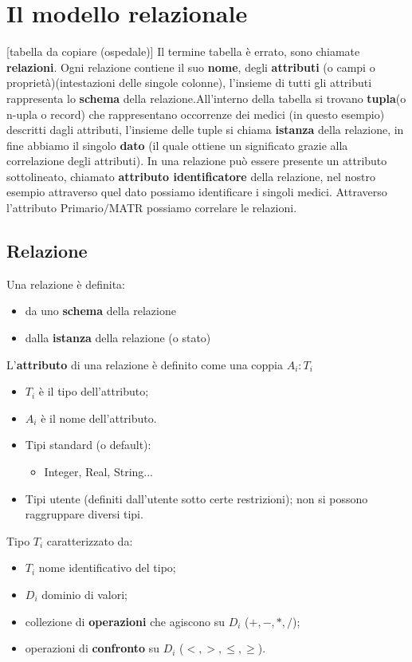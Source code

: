 \documentclass[10pt,twocolumn]{article}
\begin{document}
\section{Il modello relazionale}
[tabella da copiare (ospedale)]
\newline
Il termine tabella è errato, sono chiamate \textbf{relazioni}.
Ogni relazione contiene il suo \textbf{nome}, degli \textbf{attributi} (o campi o proprietà)(intestazioni delle singole colonne), l'insieme di tutti gli attributi rappresenta lo \textbf{schema} della relazione.\newline All'interno della tabella si trovano \textbf{tupla}(o n-upla o record) che rappresentano occorrenze dei medici (in questo esempio) descritti dagli attributi, l'insieme delle tuple si chiama \textbf{istanza} della relazione, in fine abbiamo il singolo \textbf{dato} (il quale ottiene un significato grazie alla correlazione degli attributi).  \newline In una relazione può essere presente un attributo sottolineato, chiamato \textbf{attributo identificatore} della relazione, nel nostro esempio attraverso quel dato possiamo identificare i singoli medici. \newline Attraverso l'attributo Primario$/$MATR possiamo correlare le relazioni. 

\subsection{Relazione}
Una relazione è definita:
\begin{itemize}
    \item da uno \textbf{schema} della relazione
    \item dalla \textbf{istanza} della relazione (o stato)
\end{itemize}
L'\textbf{attributo} di una relazione è definito come una coppia $A_i:T_i$
\begin{itemize}
    \item $T_i$ è il tipo dell'attributo;
    \item $A_i$ è il nome dell'attributo.
\end{itemize}
\begin{itemize}
    \item Tipi standard (o default):
    \begin{itemize}
        \item Integer, Real, String...
    \end{itemize}
    \item Tipi utente (definiti dall'utente sotto certe restrizioni); non si possono raggruppare diversi tipi.
\end{itemize}
Tipo $T_i$ caratterizzato da:
\begin{itemize}
    \item $T_i$ nome identificativo del tipo;
    \item $D_i$ dominio di valori;
    \item collezione di \textbf{operazioni} che agiscono su $D_i$ ($+,-,*,/$);
    \item operazioni di \textbf{confronto} su $D_i$ ($<, >, \leq, \geq$).
\end{itemize}
\end{document}
